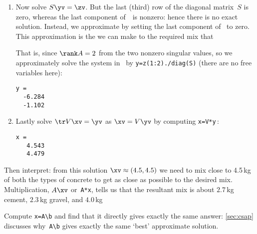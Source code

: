 \begin{example}
\begin{solution}
\begin{enumerate}
\item Now solve \(S\yv=\zv\).
But the last (third) row of the diagonal matrix~\(S\) is zero, whereas the last component of~\zv\ is nonzero: hence there is no exact solution. 
Instead, we approximate by setting the last component of \zv\ to zero.
This approximation is the \emph{} we can make to the required mix that 

That is, since \(\rank A=2\) from the two nonzero singular values, so we approximately solve the system in \script\ by \verb|y=z(1:2)./diag(S)| (there are no free variables here):
\begin{verbatim}
y =
  -6.284
  -1.102
\end{verbatim}

\item Lastly solve \(\tr V\xv=\yv\) as \(\xv=V\yv\) by computing \verb|x=V*y|\,:
\begin{verbatim}
x =
   4.543
   4.479
\end{verbatim}
\end{enumerate}
Then interpret: from this solution \(\xv\approx(4.5,4.5)\) we need to mix close to 4.5\,kg of both the types of concrete to get as close as possible to the desired mix.
Multiplication, \(A\xv\) or~\verb|A*x|, tells us that the resultant mix is about \(2.7\)\,kg cement, \(2.3\)\,kg gravel, and \(4.0\)\,kg 

Compute \verb|x=A\b| and find that it directly gives exactly the same answer: \cref{sec:csap} discusses why~\verb|A\b| gives exactly the same `best' approximate solution. 
\end{solution}
\end{example}







